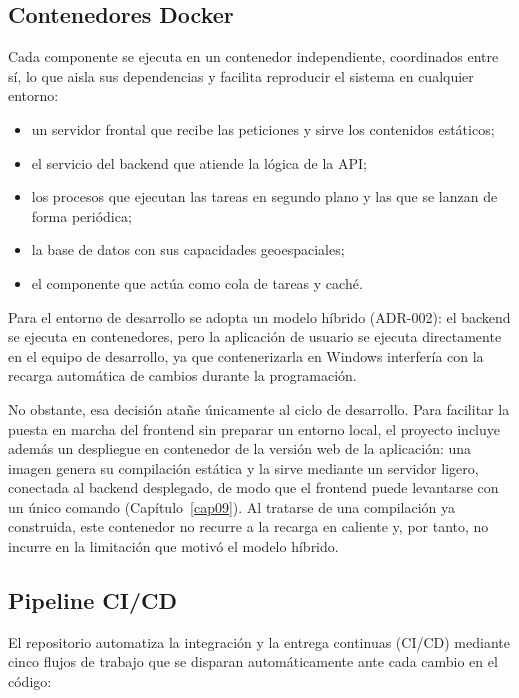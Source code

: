 \subsection{Contenedores Docker}\label{subsec:docker}

Cada componente se ejecuta en un contenedor independiente, coordinados entre s\'i, lo que aisla sus
dependencias y facilita reproducir el sistema en cualquier entorno:

\begin{itemize}
  \item un servidor frontal que recibe las peticiones y sirve los contenidos est\'aticos;
  \item el servicio del backend que atiende la l\'ogica de la API;
  \item los procesos que ejecutan las tareas en segundo plano y las que se lanzan de forma
    peri\'odica;
  \item la base de datos con sus capacidades geoespaciales;
  \item el componente que act\'ua como cola de tareas y cach\'e.
\end{itemize}

Para el entorno de desarrollo se adopta un modelo h\'ibrido (ADR-002): el backend se ejecuta en
contenedores, pero la aplicaci\'on de usuario se ejecuta directamente en el equipo de desarrollo,
ya que contenerizarla en Windows interfer\'ia con la recarga autom\'atica de cambios durante la
programaci\'on.

No obstante, esa decisi\'on ata\~ne \'unicamente al ciclo de desarrollo. Para facilitar la puesta
en marcha del frontend sin preparar un entorno local, el proyecto incluye adem\'as un despliegue en
contenedor de la versi\'on web de la aplicaci\'on: una imagen genera su compilaci\'on est\'atica y
la sirve mediante un servidor ligero, conectada al backend desplegado, de modo que el frontend
puede levantarse con un \'unico comando (Cap\'itulo~\ref{cap09}). Al tratarse de una compilaci\'on
ya construida, este contenedor no recurre a la recarga en caliente y, por tanto, no incurre en la
limitaci\'on que motiv\'o el modelo h\'ibrido.

\subsection{Pipeline CI/CD}\label{subsec:cicd}

El repositorio automatiza la integraci\'on y la entrega continuas (CI/CD) mediante cinco flujos de
trabajo que se disparan autom\'aticamente ante cada cambio en el c\'odigo:

